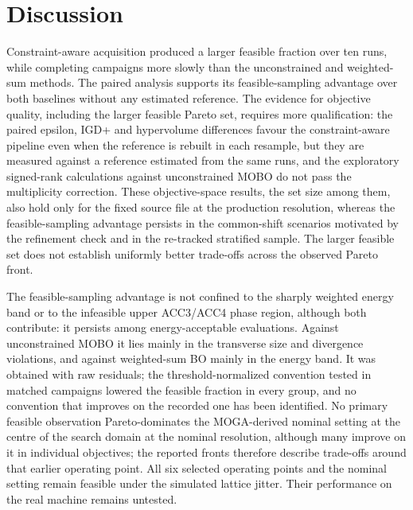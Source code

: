 \documentclass[aps,prab,reprint,superscriptaddress,amsmath,amssymb,floatfix]{revtex4-2}
\begin{document}
\section{Discussion}
\label{sec:discussion}
Constraint-aware acquisition produced a larger feasible fraction over ten runs, while completing
campaigns more slowly than the unconstrained and
weighted-sum methods. The paired analysis supports its feasible-sampling advantage over both
baselines without any estimated reference. The evidence for objective quality, including the larger
feasible Pareto set, requires more
qualification: the paired epsilon, IGD+ and hypervolume differences favour the constraint-aware pipeline even
when the reference is rebuilt in each resample, but they are measured against a reference
estimated from the same runs, and the exploratory signed-rank calculations against
unconstrained MOBO do not pass the multiplicity correction. These objective-space results,
the set size among them, also hold only for the fixed
source file at the production resolution, whereas the feasible-sampling advantage persists
in the common-shift scenarios motivated by the refinement check and in the re-tracked
stratified sample. The larger feasible set does
not establish uniformly better trade-offs across the observed Pareto front.

The feasible-sampling advantage is not confined to the sharply weighted energy band or to the
infeasible upper ACC3/ACC4 phase region, although both contribute: it persists among
energy-acceptable evaluations. Against unconstrained MOBO it lies mainly in the transverse size
and divergence violations, and against weighted-sum BO mainly in the energy band. It was
obtained with raw residuals; the threshold-normalized convention tested in matched campaigns
lowered the feasible fraction in every group, and no convention that improves on the recorded
one has been identified. No primary
feasible observation Pareto-dominates the MOGA-derived nominal setting at the centre of the
search domain at the nominal resolution, although many improve on it in individual objectives;
the reported fronts therefore describe trade-offs around that earlier operating point. All six
selected operating points and the nominal setting remain feasible under the simulated lattice
jitter. Their performance on the real machine remains untested.
\end{document}
